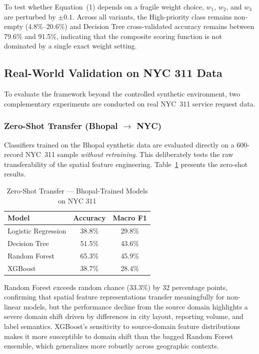 \documentclass[12pt,onecolumn,draftclsnofoot]{IEEEtran}
\begin{document}
To test whether Equation~(1) depends on a fragile weight choice, $w_1$, $w_2$, and $w_3$ are perturbed by $\pm 0.1$. Across all variants, the High-priority class remains non-empty (4.8\%--20.6\%) and Decision Tree cross-validated accuracy remains between 79.6\% and 91.5\%, indicating that the composite scoring function is not dominated by a single exact weight setting.

\subsection{Real-World Validation on NYC 311 Data}

To evaluate the framework beyond the controlled synthetic environment, two complementary experiments are conducted on real NYC~311 service request data.

\subsubsection{Zero-Shot Transfer (Bhopal $\to$ NYC)}

Classifiers trained on the Bhopal synthetic data are evaluated directly on a 600-record NYC~311 sample \textit{without retraining}. This deliberately tests the raw transferability of the spatial feature engineering. Table~\ref{tab:nyc311_zeroshot} presents the zero-shot results.

\begin{table}[h]
\centering
\caption{Zero-Shot Transfer --- Bhopal-Trained Models on NYC 311}
\label{tab:nyc311_zeroshot}
\begin{tabular}{lcc}
\toprule
Model & Accuracy & Macro F1 \\
\midrule
Logistic Regression & 38.8\% & 29.8\% \\
Decision Tree & 51.5\% & 43.6\% \\
Random Forest & 65.3\% & 45.9\% \\
XGBoost & 38.7\% & 28.4\% \\
\bottomrule
\end{tabular}
\end{table}

Random Forest exceeds random chance (33.3\%) by 32 percentage points, confirming that spatial feature representations transfer meaningfully for non-linear models, but the performance decline from the source domain highlights a severe domain shift driven by differences in city layout, reporting volume, and label semantics. XGBoost's sensitivity to source-domain feature distributions makes it more susceptible to domain shift than the bagged Random Forest ensemble, which generalizes more robustly across geographic contexts.
\end{document}
